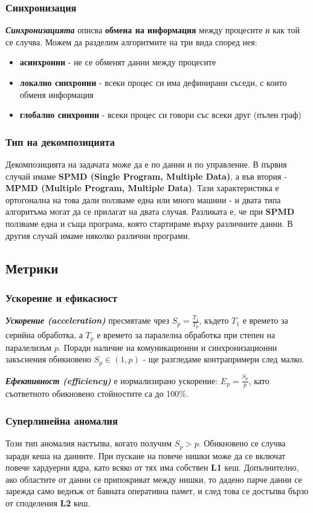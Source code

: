 \documentclass{scrartcl}
\begin{document}
\begin{FlushLeft}
\subsubsection{Синхронизация}
\textbf{\textit{Синхронизацията}} описва \textbf{обмена на информация} между процесите и как той се случва.
Можем да разделим алгоритмите на три вида според нея:
\begin{itemize}
    \item \textbf{асинхронни} - не се обменят данни между процесите
    \item \textbf{локално синхронни} - всеки процес си има дефинирани съседи, с които обменя информация
    \item \textbf{глобално синхронни} - всеки процес си говори със всеки друг (пълен граф)
\end{itemize}

\subsubsection{Тип на декомпозицията}
Декомпозицията на задачата може да е по данни и по управление. В първия случай имаме \textbf{SPMD (Single Program, Multiple Data)}, а
във втория - \textbf{MPMD (Multiple Program, Multiple Data)}. Тази характеристика е ортогонална на това дали ползваме една или много машини 
- и двата типа алгоритъма могат да се прилагат на двата случая. Разликата е, че при \textbf{SPMD} ползваме една и съща програма, 
която стартираме върху различните данни. В другия случай имаме няколко различни програми.

\subsection{Метрики}
\subsubsection{Ускорение и ефикасност}
\textbf{\textit{Ускорение (acceleration)}} пресмятаме чрез $S_p = \frac{T_1}{T_p}$, където $T_1$ е времето за серийна обработка, а $T_p$ е времето за паралелна обработка при степен на паралелизъм $p$.
Поради наличие на комуникационни и синхронизационни закъснения обикновено $S_p \in (1, p)$ - ще разгледаме контрапримери след малко.

\textbf{\textit{Ефективност (efficiency)}} е нормализирано ускорение: $E_p = \frac{S_p}{p}$, като съответното обикновено стойностите са до 100\%.

\subsubsection{Суперлинейна аномалия}
Този тип аномалия настъпва, когато получим $S_p > p$. Обикновено се случва заради кеша на данните.
При пускане на повече нишки може да се включат повече хардуерни ядра, като всяко от тях има собствен \textbf{L1} кеш.
Допълнително, ако областите от данни се припокриват между нишки, то дадено парче данни се зарежда само веднъж от 
бавната оперативна памет, и след това се достъпва бързо от споделения \textbf{L2} кеш.


\end{FlushLeft}
\end{document}
